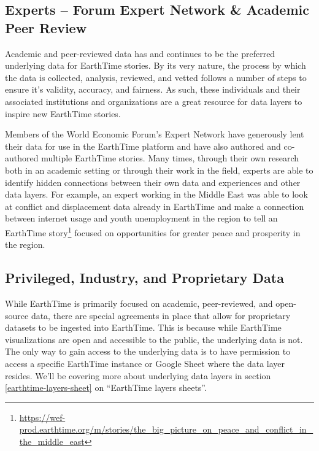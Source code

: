 \documentclass[
  12pt,
]{krantz}
\renewcommand{\href}[2]{#2\footnote{\url{#1}}}
\begin{document}
\hypertarget{experts-forum-expert-network-academic-peer-review}{%
\subsection{Experts -- Forum Expert Network \& Academic Peer Review}\label{experts-forum-expert-network-academic-peer-review}}

Academic and peer-reviewed data has and continues to be the preferred underlying data for EarthTime stories. By its very nature, the process by which the data is collected, analysis, reviewed, and vetted follows a number of steps to ensure it's validity, accuracy, and fairness. As such, these individuals and their associated institutions and organizations are a great resource for data layers to inspire new EarthTime stories.

Members of the World Economic Forum's Expert Network have generously lent their data for use in the EarthTime platform and have also authored and co-authored multiple EarthTime stories. Many times, through their own research both in an academic setting or through their work in the field, experts are able to identify hidden connections between their own data and experiences and other data layers. For example, an expert working in the Middle East was able to look at conflict and displacement data already in EarthTime and make a connection between internet usage and youth unemployment in the region to tell an \href{https://wef-prod.earthtime.org/m/stories/the_big_picture_on_peace_and_conflict_in_the_middle_east}{EarthTime story} focused on opportunities for greater peace and prosperity in the region.

\hypertarget{privileged-industry-and-proprietary-data}{%
\subsection{Privileged, Industry, and Proprietary Data}\label{privileged-industry-and-proprietary-data}}

While EarthTime is primarily focused on academic, peer-reviewed, and open-source data, there are special agreements in place that allow for proprietary datasets to be ingested into EarthTime. This is because while EarthTime visualizations are open and accessible to the public, the underlying data is not. The only way to gain access to the underlying data is to have permission to access a specific EarthTime instance or Google Sheet where the data layer resides. We'll be covering more about underlying data layers in section \ref{earthtime-layers-sheet} on ``EarthTime layers sheets''.
\end{document}
